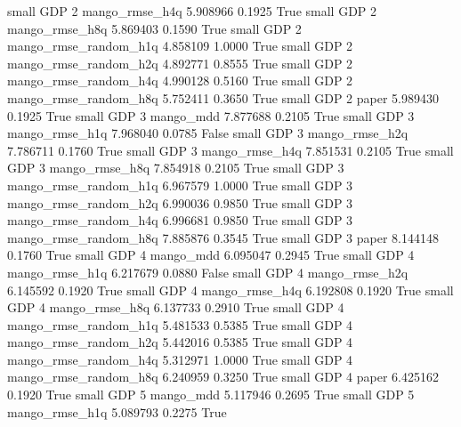      small      GDP                 2        mango_rmse_h4q   5.908966      0.1925    True
     small      GDP                 2        mango_rmse_h8q   5.869403      0.1590    True
     small      GDP                 2 mango_rmse_random_h1q   4.858109      1.0000    True
     small      GDP                 2 mango_rmse_random_h2q   4.892771      0.8555    True
     small      GDP                 2 mango_rmse_random_h4q   4.990128      0.5160    True
     small      GDP                 2 mango_rmse_random_h8q   5.752411      0.3650    True
     small      GDP                 2                 paper   5.989430      0.1925    True
     small      GDP                 3             mango_mdd   7.877688      0.2105    True
     small      GDP                 3        mango_rmse_h1q   7.968040      0.0785   False
     small      GDP                 3        mango_rmse_h2q   7.786711      0.1760    True
     small      GDP                 3        mango_rmse_h4q   7.851531      0.2105    True
     small      GDP                 3        mango_rmse_h8q   7.854918      0.2105    True
     small      GDP                 3 mango_rmse_random_h1q   6.967579      1.0000    True
     small      GDP                 3 mango_rmse_random_h2q   6.990036      0.9850    True
     small      GDP                 3 mango_rmse_random_h4q   6.996681      0.9850    True
     small      GDP                 3 mango_rmse_random_h8q   7.885876      0.3545    True
     small      GDP                 3                 paper   8.144148      0.1760    True
     small      GDP                 4             mango_mdd   6.095047      0.2945    True
     small      GDP                 4        mango_rmse_h1q   6.217679      0.0880   False
     small      GDP                 4        mango_rmse_h2q   6.145592      0.1920    True
     small      GDP                 4        mango_rmse_h4q   6.192808      0.1920    True
     small      GDP                 4        mango_rmse_h8q   6.137733      0.2910    True
     small      GDP                 4 mango_rmse_random_h1q   5.481533      0.5385    True
     small      GDP                 4 mango_rmse_random_h2q   5.442016      0.5385    True
     small      GDP                 4 mango_rmse_random_h4q   5.312971      1.0000    True
     small      GDP                 4 mango_rmse_random_h8q   6.240959      0.3250    True
     small      GDP                 4                 paper   6.425162      0.1920    True
     small      GDP                 5             mango_mdd   5.117946      0.2695    True
     small      GDP                 5        mango_rmse_h1q   5.089793      0.2275    True
